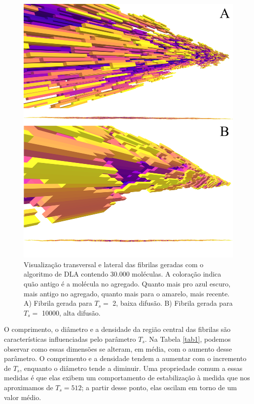 \documentclass{article}
\begin{document}
\begin{figure}[H]
    \centering
    \includegraphics[width=\textwidth]{figures/fibrils.png}

    \caption{Visualização transversal e lateral das fibrilas geradas com o algoritmo de DLA contendo 30.000 moléculas.
    A coloração indica quão antigo é a molécula no agregado. Quanto mais pro azul escuro, 
    mais antigo no agregado, quanto mais para o amarelo, mais recente. 
    A) Fibrila gerada para $T_{s} = $ 2, baixa difusão. B) Fibrila gerada para $T_{s} = $ 10000, alta difusão.} 

    \label{R1}
\end{figure}

O comprimento, o diâmetro e a densidade da região central das fibrilas são características influenciadas pelo 
parâmetro \(T_{s}\). Na Tabela \ref{tab1}, podemos observar como essas dimensões se alteram, em média, com o 
aumento desse parâmetro. O comprimento e a densidade tendem a aumentar com o incremento de \(T_{s}\), enquanto 
o diâmetro tende a diminuir. Uma propriedade comum a essas medidas é que elas exibem um comportamento de 
estabilização à medida que nos aproximamos de \(T_{s} = 512\); a partir desse ponto, elas oscilam em torno de um 
valor médio. 
\end{document}
